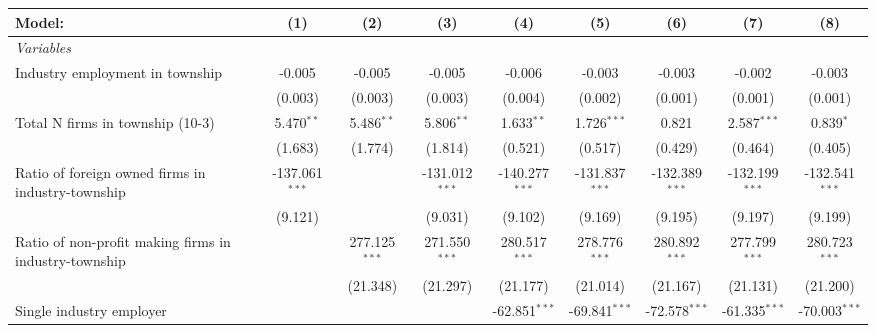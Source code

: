 \begingroup
\centering
\begin{tabular}{lcccccccc}
   \tabularnewline \midrule \midrule
   Model:                                                & (1)              & (2)             & (3)              & (4)              & (5)              & (6)              & (7)              & (8)\\  
   \midrule
   \emph{Variables}\\
   Industry employment in township                       & -0.005           & -0.005          & -0.005           & -0.006           & -0.003           & -0.003           & -0.002           & -0.003\\   
                                                         & (0.003)          & (0.003)         & (0.003)          & (0.004)          & (0.002)          & (0.001)          & (0.001)          & (0.001)\\   
   Total N firms in township (10-3)                      & 5.470$^{**}$     & 5.486$^{**}$    & 5.806$^{**}$     & 1.633$^{**}$     & 1.726$^{***}$    & 0.821            & 2.587$^{***}$    & 0.839$^{*}$\\   
                                                         & (1.683)          & (1.774)         & (1.814)          & (0.521)          & (0.517)          & (0.429)          & (0.464)          & (0.405)\\   
   Ratio of foreign owned firms in industry-township     & -137.061$^{***}$ &                 & -131.012$^{***}$ & -140.277$^{***}$ & -131.837$^{***}$ & -132.389$^{***}$ & -132.199$^{***}$ & -132.541$^{***}$\\   
                                                         & (9.121)          &                 & (9.031)          & (9.102)          & (9.169)          & (9.195)          & (9.197)          & (9.199)\\   
   Ratio of non-profit making firms in industry-township &                  & 277.125$^{***}$ & 271.550$^{***}$  & 280.517$^{***}$  & 278.776$^{***}$  & 280.892$^{***}$  & 277.799$^{***}$  & 280.723$^{***}$\\   
                                                         &                  & (21.348)        & (21.297)         & (21.177)         & (21.014)         & (21.167)         & (21.131)         & (21.200)\\   
   Single industry employer                              &                  &                 &                  & -62.851$^{***}$  & -69.841$^{***}$  & -72.578$^{***}$  & -61.335$^{***}$  & -70.003$^{***}$\\   

\end{tabular}
